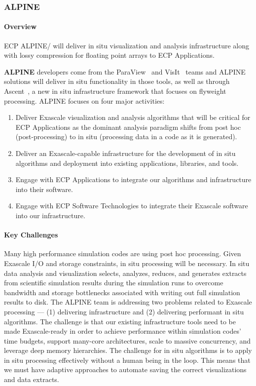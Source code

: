 
\subsubsection{ ALPINE} 


\paragraph{Overview} 

ECP ALPINE/{\zfp} will deliver in situ visualization and analysis infrastructure along with lossy compression for floating point arrays to ECP Applications.  

\textbf{ALPINE} developers come from the ParaView~\cite{alpine:Paraview1,alpine:Paraview2} and VisIt~\cite{alpine:VisIt} teams and ALPINE solutions will deliver in situ functionality in those tools, as well as through Ascent~\cite{alpine:Ascent}, a new in situ infrastructure framework that focuses on flyweight processing. 
%
ALPINE  focuses on four major activities: 
\begin{enumerate}
        \setlength{\itemsep}{1pt}
        \setlength{\parskip}{0pt}
        \setlength{\parsep}{0pt}
\item Deliver Exascale visualization and analysis algorithms that will be critical for ECP Applications as the dominant analysis paradigm shifts from post hoc (post-processing) to in situ (processing data in a code as it is generated). 
\item Deliver an Exascale-capable infrastructure for the development of in situ algorithms and deployment into existing applications, libraries, and tools. 
\item Engage with ECP Applications to integrate our algorithms and infrastructure into their software. 
\item Engage with ECP Software Technologies to integrate their Exascale software into our infrastructure. 
\end{enumerate}


\paragraph{Key  Challenges}

Many high performance simulation codes are using post hoc processing.  
Given Exascale I/O and storage constraints, in situ processing will be necessary. 
In situ data analysis and visualization selects, analyzes, reduces, and generates extracts from scientific simulation results during the simulation runs to overcome bandwidth and storage bottlenecks associated with writing out full simulation results to disk. 
The ALPINE team is addressing two problems related to Exascale processing --- (1) delivering infrastructure and (2) delivering performant in situ algorithms.
The challenge is that our existing infrastructure tools need to be made Exascale-ready in order to 
achieve performance within simulation codes' time budgets, support many-core architectures, scale to massive concurrency, and leverage deep memory hierarchies.
The challenge for in situ algorithms is to apply in situ processing effectively without a human being in the loop.
This means that we must have adaptive approaches to automate saving the correct visualizations and data extracts.


